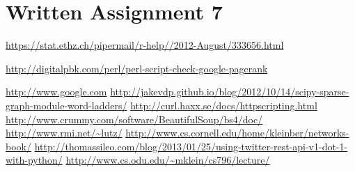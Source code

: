 \documentclass[]{svmono}
\begin{document}
\chapter{Written Assignment 7}

\noindent

%
%






\begin{thebibliography}{9}




\url{https://stat.ethz.ch/pipermail/r-help//2012-August/333656.html}


\url{http://digitalpbk.com/perl/perl-script-check-google-pagerank}


\url{http://www.google.com}
\url{http://jakevdp.github.io/blog/2012/10/14/scipy-sparse-graph-module-word-ladders/}
\url{http://curl.haxx.se/docs/httpscripting.html}
\url{http://www.crummy.com/software/BeautifulSoup/bs4/doc/}
\url{http://www.rmi.net/~lutz/}
\url{http://www.cs.cornell.edu/home/kleinber/networks-book/}
\url{http://thomassileo.com/blog/2013/01/25/using-twitter-rest-api-v1-dot-1-with-python/}
\url{http://www.cs.odu.edu/~mklein/cs796/lecture/}

\end{thebibliography}














\end{document}
